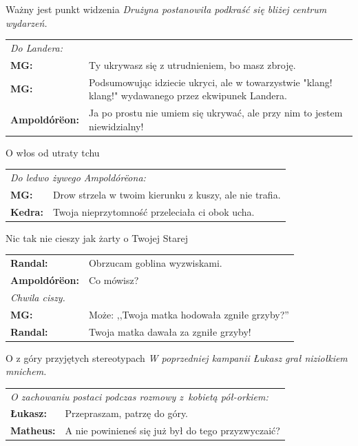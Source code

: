 \documentclass[10pt,twoside,twocolumn]{book}
\begin{document}
\begin{rpg-quotebox}{Ważny jest punkt widzenia}
   \textit{Drużyna postanowiła podkraść się bliżej centrum wydarzeń.}\\

   \begin{tabularx}{\columnwidth}{lX}
      \multicolumn{2}{l}{\textit{Do Landera:}}\\
      \textbf{MG:} & Ty ukrywasz się z utrudnieniem, bo masz zbroję.\\
      \textbf{MG:} & Podsumowując idziecie ukryci, ale w towarzystwie "klang! klang!" wydawanego przez ekwipunek Landera.\\
      \textbf{Ampoldórëon:} & Ja po prostu nie umiem się ukrywać, ale przy nim to jestem niewidzialny!\\
   \end{tabularx}
\end{rpg-quotebox}

\begin{rpg-quotebox}{O włos od utraty tchu}
   \begin{tabularx}{\columnwidth}{lX}
      \multicolumn{2}{l}{\textit{Do ledwo żywego Ampoldórëona:}}\\
      \textbf{MG:} & Drow strzela w twoim kierunku z kuszy, ale nie trafia.\\
      \textbf{Kedra:} & Twoja nieprzytomność przeleciała ci obok ucha.\\
   \end{tabularx}
\end{rpg-quotebox}

\begin{rpg-quotebox}{Nic tak nie cieszy jak żarty o Twojej Starej}
   \begin{tabularx}{\columnwidth}{lX}
      \textbf{Randal:} & Obrzucam goblina wyzwiskami.\\
      \textbf{Ampoldórëon:} & Co mówisz?\\
      \multicolumn{2}{l}{\textit{Chwila ciszy.}}\\
      \textbf{MG:} & Może: ,,Twoja matka hodowała zgniłe grzyby?''\\
      \textbf{Randal:} & Twoja matka dawała za zgniłe grzyby!\\
   \end{tabularx}
\end{rpg-quotebox}

\begin{rpg-quotebox}{O z góry przyjętych stereotypach}
   \textit{W poprzedniej kampanii Łukasz grał niziołkiem mnichem.}\\

   \begin{tabularx}{\columnwidth}{lX}
      \multicolumn{2}{X}{\textit{O zachowaniu postaci podczas rozmowy z~kobietą pół-orkiem:}}\\
      \textbf{Łukasz:} & Przepraszam, patrzę do góry.\\
      \textbf{Matheus:} & A nie powinieneś się już był do tego przyzwyczaić?\\
   \end{tabularx}
\end{rpg-quotebox}
\end{document}
